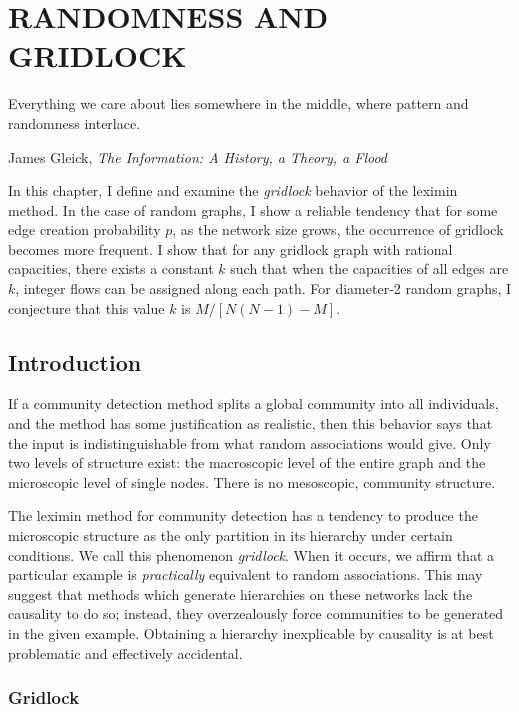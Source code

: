 \chapter{RANDOMNESS AND GRIDLOCK} \label{ch:random}

\epigraph{Everything we care about lies somewhere in the middle, where pattern and randomness interlace.}{James Gleick, \emph{The Information: A History, a Theory, a Flood}}

In this chapter, I define and examine the \emph{gridlock} behavior of the leximin method. In the case of random graphs, I show a reliable tendency that for some edge creation probability $p$, as the network size grows, the occurrence of gridlock becomes more frequent. I show that for any gridlock graph with rational capacities, there exists a constant $k$ such that when the capacities of all edges are $k$, integer flows can be assigned along each path. For diameter-2 random graphs, I conjecture that this value $k$ is $M / [N (N-1) - M]$.





\section{Introduction}

If a community detection method splits a global community into all individuals, and the method has some justification as realistic, then this behavior says that the input is indistinguishable from what random associations would give. Only two levels of structure exist: the macroscopic level of the entire graph and the microscopic level of single nodes. There is no mesoscopic, community structure.

The leximin method for community detection has a tendency to produce the microscopic structure as the only partition in its hierarchy under certain conditions. We call this phenomenon \emph{gridlock}. When it occurs, we affirm that a particular example is \emph{practically} equivalent to random associations. This may suggest that methods which generate hierarchies on these networks lack the causality to do so; instead, they overzealously force communities to be generated in the given example. Obtaining a hierarchy inexplicable by causality is at best problematic and effectively accidental. 

\subsection{Gridlock}

